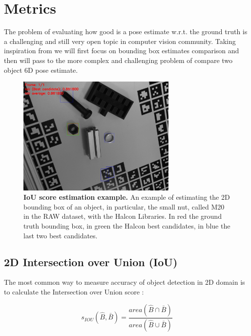 \section{Metrics}\label{sec:metrics}
The problem of evaluating how good is a pose estimate w.r.t. the ground truth is a challenging and still very open topic in computer vision community.  Taking inspiration from \cite{hodan20166DPoseEstimation} we will first focus on bounding box estimates comparison and then will pass to the more complex and challenging problem of compare two object 6D pose estimate.

\begin{figure}
    \centering
    \includegraphics[width=0.7\textwidth]{figures/2_benchmarks_and_metrics/iou_example}
    \caption{\textbf{IoU score estimation example.} An example of estimating the 2D bounding box of an object, in particular, the small nut, called M20 in the RAW dataset, with the Halcon Libraries. In red the ground truth bounding box, in green the Halcon best candidates, in blue the last two best candidates.} 
    \label{fig:iou_example}
\end{figure}

\subsection{2D Intersection over Union (IoU)}\label{subsec:iou}
The most common way to measure accuracy of object detection in 2D domain is to calculate the Intersection over Union score \cite{everingham2015challenge}:

\begin{equation}
    \label{eq:iou_score}
    s_{IOU}(\hat{B}, \bar{B}) = \dfrac{area(\hat{B} \cap \bar{B})}{area(\hat{B} \cup \bar{B})}
\end{equation}

